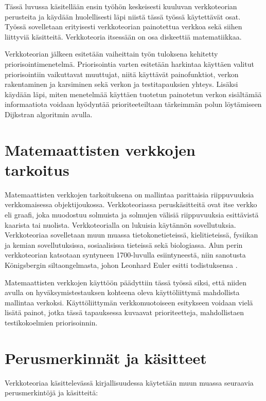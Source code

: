Tässä luvussa käsitellään ensin työhön keskeisesti kuuluvan verkkoteorian perusteita ja käydään huolellisesti läpi niistä tässä työssä käytettävät osat.
Työssä sovelletaan erityisesti verkkoteorian painotettua verkkoa sekä siihen liittyviä käsitteitä.
Verkkoteoria itsessään on osa diskeettiä matematiikkaa.

Verkkoteorian jälkeen esitetään vaiheittain työn tuloksena kehitetty priorisointimenetelmä.
Priorisointia varten esitetään harkintaa käyttäen valitut priorisointiin vaikuttavat muuttujat, niitä käyttävät painofunktiot, verkon rakentaminen ja karsiminen sekä verkon ja testitapauksien yhteys.
Lisäksi käydään läpi, miten menetelmää käyttäen tuotetun painotetun verkon sisältämää informaatiota voidaan hyödyntää prioriteeteiltaan tärkeimmän polun löytämiseen Dijkstran algoritmin avulla.

\section{Matemaattisten verkkojen tarkoitus} \label{ch:09_matemaattisten_verkkojen_tarkoitus}

  Matemaattisten verkkojen tarkoituksena on mallintaa parittaisia riippuvuuksia verkkomaisessa objektijoukossa.
  Verkkoteoriassa peruskäsitteitä ovat itse verkko eli graafi, joka muodostuu solmuista ja solmujen välisiä riippuvuuksia esittävistä kaarista tai nuolista.
  Verkkoteorialla on lukuisia käytännön sovellutuksia. Verkkoteoriaa sovelletaan muun muassa tietokonetieteissä, kielitieteissä, fysiikan ja kemian sovellutuksissa, sosiaalisissa tieteissä sekä biologiassa.
  Alun perin verkkoteorian katsotaan syntyneen 1700-luvulla esiintyneestä, niin sanotusta Königsbergin siltaongelmasta, johon Leonhard Euler esitti todistuksensa \cite[s.~1-2]{graph_theory_concepts_1}.

  Matemaattisten verkkojen käyttöön päädyttiin tässä työssä siksi, että niiden avulla on hyväksymistestauksen kohteena oleva käyttöliittymä mahdollista mallintaa verkoksi.
  Käyttöliittymän verkkomuotoiseen esitykseen voidaan vielä lisätä painot, jotka tässä tapauksessa kuvaavat prioriteetteja, mahdollistaen testikokoelmien priorisoinnin.

\section{Perusmerkinnät ja käsitteet} \label{ch:09_perusmerkinnat_ja_kasitteet}

  Verkkoteoriaa käsittelevässä kirjallisuudessa \cite{graph_theory_concepts_1}\cite{graph_theory_concepts_2}\cite{graph_theory_concepts_3} käytetään muun muassa seuraavia perusmerkintöjä ja käsitteitä:

